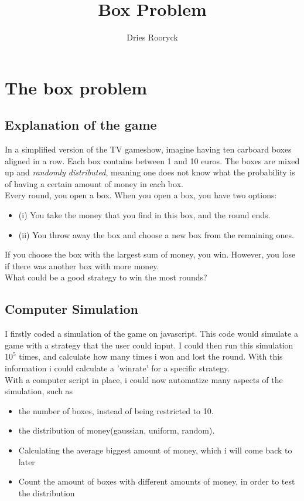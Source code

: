\documentclass{report}
\title{Box Problem}
\author{Dries Rooryck}
\begin{document}
\maketitle
\chapter{The box problem }
\section{Explanation of the game}
In a simplified version of the TV gameshow, imagine having ten  carboard boxes aligned in a row. Each box contains between 1 and 10 euros. The boxes are mixed up and \textit{randomly distributed}, meaning one does not know what the probability is of having a certain amount of money in each box.\\
Every round, you open a box. When you open a box, you have two options:
\begin{itemize}
\item(i) You take the money that you find in this box, and the round ends. 
\item(ii) You throw away the box and choose a new box from the remaining ones. 
\end{itemize}
If you choose the box with the largest sum of money, you win. However, you lose if there was another box with more money.\\

What could be a good strategy to win the most rounds?

\section{Computer Simulation}
I firstly coded a simulation of the game on javascript. This code would simulate a game with a strategy that the user could input. I could then run this simulation $10^5$ times, and calculate how many times i won and lost the round. With this information i could calculate a 'winrate' for a specific strategy. \\
With a computer script in place, i could now automatize many aspects of the simulation, such as
\begin{itemize}
\item the number of boxes, instead of being restricted to 10.
\item the distribution of money(gaussian, uniform, random).
\item Calculating the average biggest amount of money, which i will come back to later
\item Count the amount of boxes with different amounts of money, in order to test the distribution
\end{itemize}
\end{document}

